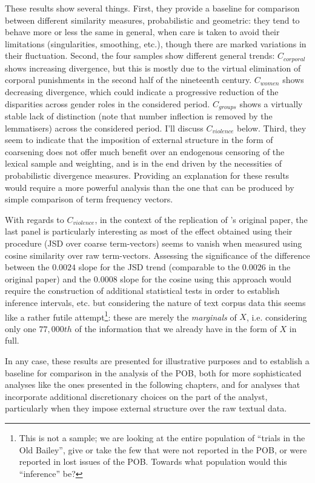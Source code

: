 These results show several things.
First, they provide a baseline for comparison between different similarity measures, probabilistic and geometric: they tend to behave more or less the same in general, when care is taken to avoid their limitations (singularities, smoothing, etc.), though there are marked variations in their fluctuation.
Second, the four samples show different general trends:
$C_{corporal}$ shows increasing divergence, but this is mostly due to the virtual elimination of corporal punishments in the second half of the nineteenth century.
$C_{women}$ shows decreasing divergence, which could indicate a progressive reduction of the disparities across gender roles in the considered period.
$C_{groups}$ shows a virtually stable lack of distinction (note that number inflection is removed by the lemmatisers) across the considered period.
I'll discuss $C_{violence}$ below.
Third, they seem to indicate that the imposition of external structure in the form of coarsening does not offer much benefit over an endogenous censoring of the lexical sample and weighting, and is in the end driven by the necessities of probabilistic divergence measures.
Providing an explanation for these results would require a more powerful analysis than the one that can be produced by simple comparison of term frequency vectors.

With regards to $C_{violence}$, in the context of the replication of \citeauthor{klingenstein2014}'s original paper, the last panel is particularly interesting as most of the effect obtained using their procedure (JSD over coarse term-vectors) seems to vanish when measured using cosine similarity over raw term-vectors.
Assessing the significance of the difference between the $0.0024$ slope for the JSD trend (comparable to the $0.0026$ in the original paper) and the $0.0008$ slope for the cosine using this approach would require the construction of additional statistical tests in order to establish inference intervals, etc. but considering the nature of text corpus data this seems like a rather futile attempt\footnote{
    This is not a sample; we are looking at the entire population of ``trials in the Old Bailey'', give or take the few that were not reported in the POB, or were reported in lost issues of the POB.
    Towards what population would this ``inference'' be?
}: these are merely the \emph{marginals} of $X$, i.e. considering only one $77,000th$ of the information that we already have in the form of $X$ in full.

In any case, these results are presented for illustrative purposes and to establish a baseline for comparison in the analysis of the POB, both for more sophisticated analyses like the ones presented in the following chapters, and for analyses that incorporate additional discretionary choices on the part of the analyst, particularly when they impose external structure over the raw textual data.

